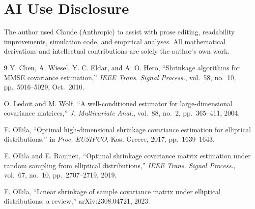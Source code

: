 \documentclass[journal]{IEEEtran}
\begin{document}
\section*{AI Use Disclosure}
The author used Claude (Anthropic) to assist with prose editing,
readability improvements, simulation code, and empirical analyses.
All mathematical derivations and intellectual contributions are
solely the author's own work.

\begin{thebibliography}{9}
Y. Chen, A. Wiesel, Y. C. Eldar, and A. O. Hero, ``Shrinkage algorithms for MMSE covariance estimation,''
\emph{IEEE Trans. Signal Process.}, vol.~58, no.~10, pp.~5016--5029, Oct.~2010.

O. Ledoit and M. Wolf, ``A well-conditioned estimator for large-dimensional covariance matrices,''
\emph{J. Multivariate Anal.}, vol.~88, no.~2, pp.~365--411, 2004.

E. Ollila, ``Optimal high-dimensional shrinkage covariance estimation for elliptical distributions,''
in \emph{Proc. EUSIPCO}, Kos, Greece, 2017, pp.~1639--1643.

E. Ollila and E. Raninen, ``Optimal shrinkage covariance matrix estimation under random sampling
from elliptical distributions,''
\emph{IEEE Trans. Signal Process.}, vol.~67, no.~10, pp.~2707--2719, 2019.

E. Ollila, ``Linear shrinkage of sample covariance matrix under elliptical distributions: a review,''
arXiv:2308.04721, 2023.
\end{thebibliography}
\end{document}
